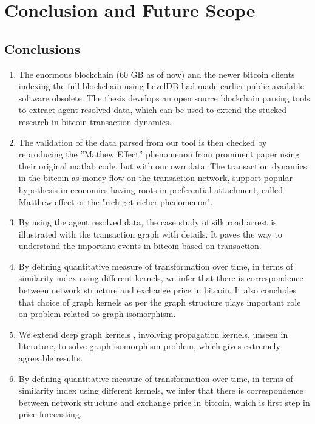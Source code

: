 \chapter{Conclusion and Future Scope} %

\label{Chapter6} %



\section{Conclusions}
\begin{enumerate}

\item The enormous blockchain (60 GB as of now) and the newer bitcoin clients indexing the full blockchain using LevelDB had made earlier public available software obsolete. The thesis develops an open source blockchain parsing tools to extract agent resolved data, which can be used to extend the stucked research in bitcoin transaction dynamics.

\item The validation of the data parsed from our tool is then checked by
reproducing the ”Mathew Effect” phenomenon from prominent paper using their original matlab code, but with our own data. The transaction dynamics in the bitcoin as money flow on the transaction network, support popular hypothesis in economics having roots in preferential attachment, called Matthew effect or the "rich get richer phenomenon".

\item By using the agent resolved data, the case study of silk road arrest is illustrated with the transaction graph with details. It paves the way to understand the important events in bitcoin based on transaction.

\item By defining quantitative measure of transformation over time, in terms of similarity index using different kernels, we infer that there is correspondence between network structure and exchange price in bitcoin. It also concludes that choice of graph kernels as per the graph structure plays important role on problem related to graph isomorphism. 

\item We extend deep graph kernels \citep{Yanardag2015},
involving propagation kernels, unseen in literature, to solve graph isomorphism problem, which gives extremely agreeable results.

\item By defining quantitative measure of transformation over time, in terms of similarity index using different kernels, we infer that there is correspondence between network structure and exchange price in bitcoin, which is first step in price forecasting.

\end{enumerate}

